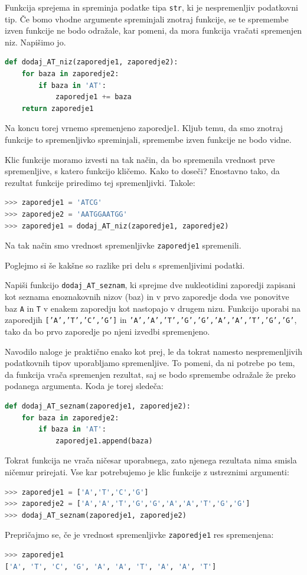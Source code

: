 \begin{resitev}
Funkcija sprejema in spreminja podatke tipa \texttt{str}, ki je nespremenljiv podatkovni tip. Če bomo vhodne argumente spreminjali znotraj funkcije, se te spremembe izven funkcije ne bodo odražale, kar pomeni, da mora funkcija vračati spremenjen niz. Napišimo jo.
\begin{lstlisting}[language=Python]
def dodaj_AT_niz(zaporedje1, zaporedje2):
    for baza in zaporedje2:
        if baza in 'AT':
            zaporedje1 += baza
    return zaporedje1
\end{lstlisting}
Na koncu torej vrnemo spremenjeno zaporedje1. Kljub temu, da smo znotraj funkcije to spremenljivko spreminjali, spremembe izven funkcije ne bodo vidne.

Klic funkcije moramo izvesti na tak način, da bo spremenila vrednost prve spremenljive, s katero funkcijo kličemo. Kako to doseči? Enostavno tako, da rezultat funkcije priredimo tej spremenljivki. Takole:
\begin{lstlisting}[language=Python]
>>> zaporedje1 = 'ATCG'
>>> zaporedje2 = 'AATGGAATGG'
>>> zaporedje1 = dodaj_AT_niz(zaporedje1, zaporedje2)
\end{lstlisting}
Na tak način smo vrednost spremenljivke \texttt{zaporedje1} spremenili.
\end{resitev}

Poglejmo si še kakšne so razlike pri delu s spremenljivimi podatki.
\begin{zgled}
Napiši funkcijo \texttt{dodaj\_AT\_seznam}, ki sprejme dve nukleotidini zaporedji zapisani kot seznama enoznakovnih nizov (baz) in v prvo zaporedje doda vse ponovitve baz \texttt{A} in \texttt{T} v enakem zaporedju kot nastopajo v drugem nizu. Funkcijo uporabi na zaporedjih \texttt{['A','T','C','G']} in \texttt{'A','A','T','G','G','A','A','T','G','G'}, tako da bo prvo zaporedje po njeni izvedbi spremenjeno.
\end{zgled}
\begin{resitev}
Navodilo naloge je praktično enako kot prej, le da tokrat namesto nespremenljivih podatkovnih tipov uporabljamo spremenljive. To pomeni, da ni potrebe po tem, da funkcija vrača spremenjen rezultat, saj se bodo spremembe odražale že preko podanega argumenta. Koda je torej sledeča:
\begin{lstlisting}[language=Python]
def dodaj_AT_seznam(zaporedje1, zaporedje2):
    for baza in zaporedje2:
        if baza in 'AT':
            zaporedje1.append(baza)
\end{lstlisting}
Tokrat funkcija ne vrača ničesar uporabnega, zato njenega rezultata nima smisla ničemur prirejati. Vse kar potrebujemo je klic funkcije z ustreznimi argumenti:
\begin{lstlisting}[language=Python]
>>> zaporedje1 = ['A','T','C','G']
>>> zaporedje2 = ['A','A','T','G','G','A','A','T','G','G']
>>> dodaj_AT_seznam(zaporedje1, zaporedje2) 
\end{lstlisting}
Prepričajmo se, če je vrednost spremenljivke \texttt{zaporedje1} res spremenjena:
\begin{lstlisting}[language=Python]
>>> zaporedje1
['A', 'T', 'C', 'G', 'A', 'A', 'T', 'A', 'A', 'T']
\end{lstlisting}
\end{resitev}